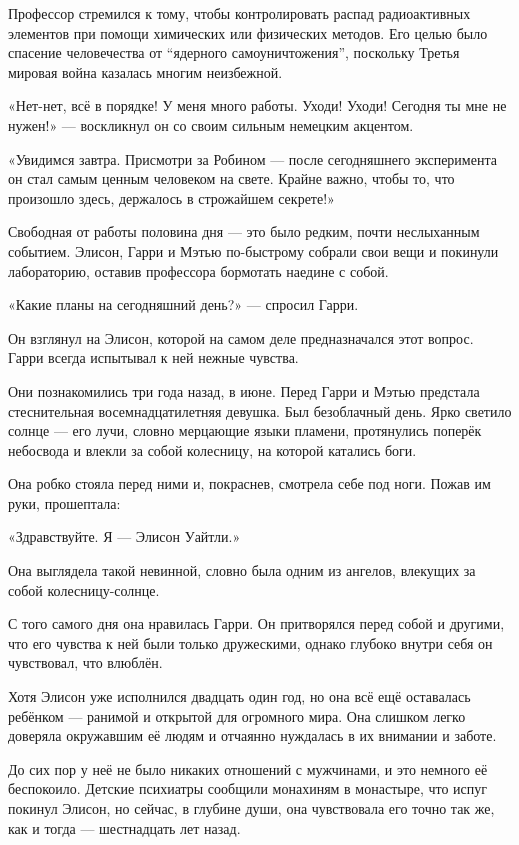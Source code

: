 \documentclass[a5paper, 9pt,
final, openany, twoside=true]{memoir}
\begin{document}
Профессор стремился к тому, чтобы контролировать распад радиоактивных элементов при помощи химических или физических методов. Его целью было спасение человечества от ``ядерного самоуничтожения'', поскольку Третья мировая война казалась многим неизбежной.\bigskip

«Нет-нет, всё в порядке! У меня много работы. Уходи! Уходи! Сегодня ты мне не нужен!» — воскликнул он со своим сильным немецким акцентом.

«Увидимся завтра. Присмотри за Робином — после сегодняшнего эксперимента он стал самым ценным человеком на свете. Крайне важно, чтобы то, что произошло здесь, держалось в строжайшем секрете!»

Свободная от работы половина дня — это было редким, почти неслыханным событием. Элисон, Гарри и Мэтью по-быстрому собрали свои вещи и покинули лабораторию, оставив профессора бормотать наедине с собой.\bigskip

«Какие планы на сегодняшний день?» — спросил Гарри.

Он взглянул на Элисон, которой на самом деле предназначался этот вопрос. Гарри всегда испытывал к ней нежные чувства.

Они познакомились три года назад, в июне. Перед Гарри и Мэтью предстала стеснительная восемнадцатилетняя девушка. Был безоблачный день. Ярко светило солнце — его лучи, словно мерцающие языки пламени, протянулись поперёк небосвода и влекли за собой колесницу, на которой катались боги.

Она робко стояла перед ними и, покраснев, смотрела себе под ноги. Пожав им руки, прошептала:

«Здравствуйте. Я — Элисон Уайтли.»\bigskip

Она выглядела такой невинной, словно была одним из ангелов, влекущих за собой колесницу-солнце.

С того самого дня она нравилась Гарри. Он притворялся перед собой и другими, что его чувства к ней были только дружескими, однако глубоко внутри себя он чувствовал, что влюблён.\bigskip

Хотя Элисон уже исполнился двадцать один год, но она всё ещё оставалась ребёнком — ранимой и открытой для огромного мира. Она слишком легко доверяла окружавшим её людям и отчаянно нуждалась в их внимании и заботе.

До сих пор у неё не было никаких отношений с мужчинами, и это немного её беспокоило. Детские психиатры сообщили монахиням в монастыре, что испуг покинул Элисон, но сейчас, в глубине души, она чувствовала его точно так же, как и тогда — шестнадцать лет назад.\bigskip
\end{document}
